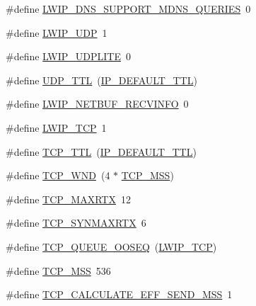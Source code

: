 \begin{DoxyCompactItemize}
\#define \hyperlink{group__lwip__opts__dns_gafcbde5706a70ace562bd1f7d2d6f77cb}{L\+W\+I\+P\+\_\+\+D\+N\+S\+\_\+\+S\+U\+P\+P\+O\+R\+T\+\_\+\+M\+D\+N\+S\+\_\+\+Q\+U\+E\+R\+I\+ES}~0
\item 
\#define \hyperlink{group__lwip__opts__udp_gab6030e96e72df649d2650fd32d7a67b3}{L\+W\+I\+P\+\_\+\+U\+DP}~1
\item 
\#define \hyperlink{group__lwip__opts__udp_ga35731bc5f337943e474a15c1cd538a61}{L\+W\+I\+P\+\_\+\+U\+D\+P\+L\+I\+TE}~0
\item 
\#define \hyperlink{group__lwip__opts__udp_ga97908a317bcba89174b5d1ccbdca0096}{U\+D\+P\+\_\+\+T\+TL}~(\hyperlink{group__lwip__opts__ipv4_ga556b9b58fd02c0fdd126791baef77411}{I\+P\+\_\+\+D\+E\+F\+A\+U\+L\+T\+\_\+\+T\+TL})
\item 
\#define \hyperlink{group__lwip__opts__udp_ga72021505969c5ce29e972486d7794baa}{L\+W\+I\+P\+\_\+\+N\+E\+T\+B\+U\+F\+\_\+\+R\+E\+C\+V\+I\+N\+FO}~0
\item 
\#define \hyperlink{group__lwip__opts__tcp_gaa4ed98deb97b77c633cb8870f34c71e9}{L\+W\+I\+P\+\_\+\+T\+CP}~1
\item 
\#define \hyperlink{group__lwip__opts__tcp_gacd5b25ea81d2894790d25da5393cdab4}{T\+C\+P\+\_\+\+T\+TL}~(\hyperlink{group__lwip__opts__ipv4_ga556b9b58fd02c0fdd126791baef77411}{I\+P\+\_\+\+D\+E\+F\+A\+U\+L\+T\+\_\+\+T\+TL})
\item 
\#define \hyperlink{group__lwip__opts__tcp_ga7f535a6efb5cdf86c3210e35ece1d6a7}{T\+C\+P\+\_\+\+W\+ND}~(4 $\ast$ \hyperlink{group__lwip__opts__tcp_gaf1ab7bb27860aa3677c387a2f3ba317b}{T\+C\+P\+\_\+\+M\+SS})
\item 
\#define \hyperlink{group__lwip__opts__tcp_ga0dee0911197855bdf19ef79778c241a6}{T\+C\+P\+\_\+\+M\+A\+X\+R\+TX}~12
\item 
\#define \hyperlink{group__lwip__opts__tcp_ga50b434a8541a4813f7b27f576c05d1b6}{T\+C\+P\+\_\+\+S\+Y\+N\+M\+A\+X\+R\+TX}~6
\item 
\#define \hyperlink{group__lwip__opts__tcp_ga89ffd0d7d1529bdb26bfbad267d0ad75}{T\+C\+P\+\_\+\+Q\+U\+E\+U\+E\+\_\+\+O\+O\+S\+EQ}~(\hyperlink{group__lwip__opts__tcp_gaa4ed98deb97b77c633cb8870f34c71e9}{L\+W\+I\+P\+\_\+\+T\+CP})
\item 
\#define \hyperlink{group__lwip__opts__tcp_gaf1ab7bb27860aa3677c387a2f3ba317b}{T\+C\+P\+\_\+\+M\+SS}~536
\item 
\#define \hyperlink{group__lwip__opts__tcp_gac04b84d32251ac558f0c3a8af85ba3a5}{T\+C\+P\+\_\+\+C\+A\+L\+C\+U\+L\+A\+T\+E\+\_\+\+E\+F\+F\+\_\+\+S\+E\+N\+D\+\_\+\+M\+SS}~1
\item 

\end{DoxyCompactItemize}
